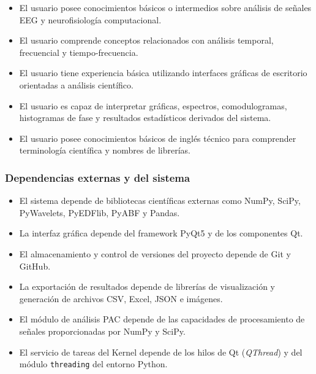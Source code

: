 \documentclass[12pt, letterpaper]{article}
\begin{document}
\begin{itemize}

\item El usuario posee conocimientos básicos o intermedios sobre análisis de
señales EEG y neurofisiología computacional.

\item El usuario comprende conceptos relacionados con análisis temporal,
frecuencial y tiempo-frecuencia.

\item El usuario tiene experiencia básica utilizando interfaces gráficas de
escritorio orientadas a análisis científico.

\item El usuario es capaz de interpretar gráficas, espectros, comodulogramas,
histogramas de fase y resultados estadísticos derivados del sistema.

\item El usuario posee conocimientos básicos de inglés técnico para
comprender terminología científica y nombres de librerías.

\end{itemize}

\subsubsection{Dependencias externas y del sistema}

\begin{itemize}

\item El sistema depende de bibliotecas científicas externas como NumPy,
SciPy, PyWavelets, PyEDFlib, PyABF y Pandas.

\item La interfaz gráfica depende del framework PyQt5 y de los componentes
Qt.

\item El almacenamiento y control de versiones del proyecto depende de Git y
GitHub.

\item La exportación de resultados depende de librerías de visualización y
generación de archivos CSV, Excel, JSON e imágenes.

\item El módulo de análisis PAC depende de las capacidades de procesamiento de
señales proporcionadas por NumPy y SciPy.

\item El servicio de tareas del Kernel depende de los hilos de Qt (\textit{QThread})
y del módulo \texttt{threading} del entorno Python.

\end{itemize}
\end{document}
